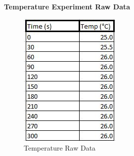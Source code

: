 \textbf{Temperature Experiment Raw Data}\begin{figure}[H]
    \includegraphics[width=\textwidth]{./preliminarywork/images/TemperatureRawData.jpg}
    \caption{Temperature Raw Data} \label{fig:TemperatureRawData}
\end{figure}

	